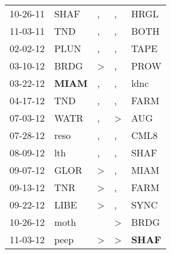 \begin{supertabular}{p{0.07\textwidth}p{0.06\textwidth}p{0.02\textwidth}p{0.02\textwidth}p{0.06\textwidth}}
          10-26-11\textsuperscript{} &           SHAF\textsuperscript{} &                , &                , &           HRGL\textsuperscript{} \\
          11-03-11\textsuperscript{} &            TND\textsuperscript{} &                , &                , &           BOTH\textsuperscript{} \\
          02-02-12\textsuperscript{} &           PLUN\textsuperscript{} &                , &                , &           TAPE\textsuperscript{} \\
          03-10-12\textsuperscript{} &           BRDG\textsuperscript{} &     \textgreater &                , &           PROW\textsuperscript{} \\
          03-22-12\textsuperscript{} &  \textbf{MIAM\textsuperscript{}} &                , &                , &           ldnc\textsuperscript{} \\
          04-17-12\textsuperscript{} &            TND\textsuperscript{} &                , &                , &           FARM\textsuperscript{} \\
          07-03-12\textsuperscript{} &           WATR\textsuperscript{} &                , &     \textgreater &            AUG\textsuperscript{} \\
          07-28-12\textsuperscript{} &           reso\textsuperscript{} &                , &                , &           CML8\textsuperscript{} \\
          08-09-12\textsuperscript{} &            lth\textsuperscript{} &                , &                , &           SHAF\textsuperscript{} \\
          09-07-12\textsuperscript{} &           GLOR\textsuperscript{} &     \textgreater &                , &           MIAM\textsuperscript{} \\
          09-13-12\textsuperscript{} &            TNR\textsuperscript{} &     \textgreater &                , &           FARM\textsuperscript{} \\
          09-22-12\textsuperscript{} &           LIBE\textsuperscript{} &     \textgreater &                , &           SYNC\textsuperscript{} \\
          10-26-12\textsuperscript{} &           moth\textsuperscript{} &                  &     \textgreater &           BRDG\textsuperscript{} \\
          11-03-12\textsuperscript{} &           peep\textsuperscript{} &     \textgreater &     \textgreater &  \textbf{SHAF\textsuperscript{}} \\

\end{supertabular}
